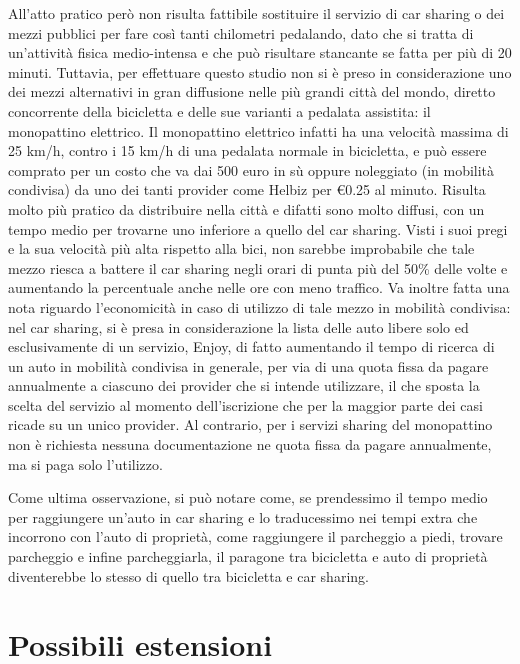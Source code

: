 All'atto pratico però non risulta fattibile sostituire il servizio di car sharing o dei mezzi pubblici per fare così tanti chilometri pedalando, dato che si tratta di un'attività fisica medio-intensa e che può risultare stancante se fatta per più di 20 minuti. Tuttavia, per effettuare questo studio non si è preso in considerazione uno dei mezzi alternativi in gran diffusione nelle più grandi città del mondo, diretto concorrente della bicicletta e delle sue varianti a pedalata assistita: il monopattino elettrico.
Il monopattino elettrico infatti ha una velocità massima di 25 km/h, contro i 15 km/h di una pedalata normale in bicicletta, e può essere comprato per un costo che va dai 500 euro in sù oppure noleggiato (in mobilità condivisa) da uno dei tanti provider come Helbiz per €0.25 al minuto. Risulta molto più pratico da distribuire nella città e difatti sono molto diffusi, con un tempo medio per trovarne uno inferiore a quello del car sharing. Visti i suoi pregi e la sua velocità più alta rispetto alla bici, non sarebbe improbabile che tale mezzo riesca a battere il car sharing negli orari di punta più del 50\% delle volte e aumentando la percentuale anche nelle ore con meno traffico. Va inoltre fatta una nota riguardo l'economicità in caso di utilizzo di tale mezzo in mobilità condivisa: nel car sharing, si è presa in considerazione la lista delle auto libere solo ed esclusivamente di un servizio, Enjoy, di fatto aumentando il tempo di ricerca di un auto in mobilità condivisa in generale, per via di una quota fissa da pagare annualmente a ciascuno dei provider che si intende utilizzare, il che sposta la scelta del servizio al momento dell'iscrizione che per la maggior parte dei casi ricade su un unico provider. Al contrario, per i servizi sharing del monopattino non è richiesta nessuna documentazione ne quota fissa da pagare annualmente, ma si paga solo l'utilizzo.

Come ultima osservazione, si può notare come, se prendessimo il tempo medio per raggiungere un'auto in car sharing e lo traducessimo nei tempi extra che incorrono con l'auto di proprietà, come raggiungere il parcheggio a piedi, trovare parcheggio e infine parcheggiarla, il paragone tra bicicletta e auto di proprietà diventerebbe lo stesso di quello tra bicicletta e car sharing.


\section{Possibili estensioni}

